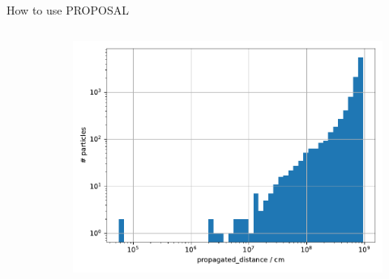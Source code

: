 \documentclass[t]{beamer}
\begin{document}
\begin{columns}[onlytextwidth]
\begin{column}{0.6\textwidth}
\begin{block}[equal height group=F]{How to use PROPOSAL}
\begin{columns}[onlytextwidth]
\begin{column}{0.45\textwidth}
          \end{column}
          \begin{column}{0.1\textwidth}
          \begin{center}
            \vspace{7em}
          \end{center}          
        \end{column}
          \begin{column}{0.45\textwidth}
            \begin{figure}
              \includegraphics[width=\linewidth, height=.4\textheight, keepaspectratio]{plots/example_output.pdf}
            \end{figure}
          \end{column}
        \end{columns}


\end{block}
\end{column}
\end{columns}
\end{document}
